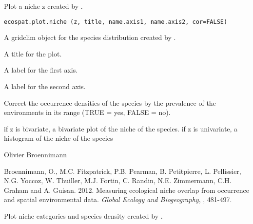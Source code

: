 \documentclass[a4paper]{book}
\begin{document}
%
\begin{Description}\relax
Plot a niche z created by .
\end{Description}
%
\begin{Usage}
\begin{verbatim}
ecospat.plot.niche (z, title, name.axis1, name.axis2, cor=FALSE)
\end{verbatim}
\end{Usage}
%
\begin{Arguments}
\begin{ldescription}
\item[\code{z}] A gridclim object for the species distribution created by .
\item[\code{title}] A title for the plot.
\item[\code{name.axis1}] A label for the first axis.
\item[\code{name.axis2}] A label for the second axis.
\item[\code{cor}] Correct the occurrence densities of the species by the prevalence of the environments in its range (TRUE = yes, FALSE = no).
\end{ldescription}
\end{Arguments}
%
\begin{Details}\relax
if z is bivariate, a bivariate plot of the niche of the species. if z is univariate, a histogram of the niche of the species
\end{Details}
%
\begin{Author}\relax
Olivier Broennimann 
\end{Author}
%
\begin{References}\relax
Broennimann, O., M.C. Fitzpatrick, P.B. Pearman, B. Petitpierre, L. Pellissier, N.G. Yoccoz, W. Thuiller, M.J. Fortin, C. Randin, N.E. Zimmermann, C.H. Graham and A. Guisan. 2012. Measuring ecological niche overlap from occurrence and spatial environmental data. \emph{Global Ecology and Biogeography}, , 481-497.
\end{References}
%
\begin{SeeAlso}\relax
{}
\end{SeeAlso}
%
\begin{Description}\relax
Plot niche categories and species density created by .
\end{Description}
\end{document}
